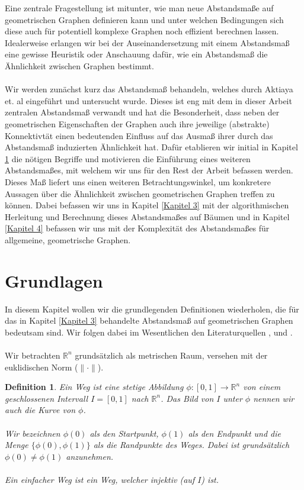\documentclass[a4paper, 12pt, twoside]{article}
\theoremstyle{Format1} %
\newtheorem{Def}{Definition}[section]       %
\begin{document}
Eine zentrale Fragestellung ist mitunter, wie man neue Abstandsmaße auf geometrischen Graphen definieren kann und unter welchen Bedingungen sich diese auch für potentiell
komplexe Graphen noch effizient berechnen lassen.
Idealerweise erlangen wir bei der Auseinandersetzung mit einem Abstandsmaß eine gewisse Heuristik oder Anschauung dafür, wie ein Abstandsmaß die Ähnlichkeit zwischen Graphen bestimmt.
\\
\\
Wir werden zunächst kurz das Abstandsmaß behandeln, welches durch Aktiaya et. al \cite{Akitaya} eingeführt und untersucht wurde.
Dieses ist eng mit dem in dieser Arbeit zentralen Abstandsmaß verwandt und hat die Besonderheit, dass neben der geometrischen Eigenschaften
der Graphen auch ihre jeweilige (abstrakte) Konnektivtät einen bedeutenden Einfluss auf das Ausmaß ihrer durch das Abstandsmaß induzierten Ähnlichkeit hat.
Dafür etablieren wir initial in Kapitel \ref{Kapitel 2} die nötigen Begriffe und
motivieren die Einführung eines weiteren Abstandsmaßes, mit welchem wir uns für den Rest der Arbeit befassen werden.
Dieses Maß liefert uns einen weiteren Betrachtungswinkel, um konkretere Aussagen
über die Ähnlichkeit zwischen geometrischen Graphen treffen zu können.
Dabei befassen wir uns in Kapitel \ref{Kapitel 3} mit der algorithmischen Herleitung und Berechnung dieses Abstandsmaßes auf Bäumen und in Kapitel \ref{Kapitel 4} befassen wir uns mit der
Komplexität des Abstandsmaßes für allgemeine, geometrische Graphen.
\newpage

\section{Grundlagen} \label{Kapitel 2}
In diesem Kapitel wollen wir die grundlegenden Definitionen wiederholen, die für das in Kapitel \ref{Kapitel 3} behandelte Abstandsmaß auf
geometrischen Graphen bedeutsam sind. Wir folgen dabei im Wesentlichen den Literaturquellen \cite{Buchin}, \cite{Akitaya} und \cite{Alt}.
\\
\\
Wir betrachten $ \mathbb{R}^n $ grundsätzlich als metrischen Raum, versehen mit der euklidischen Norm ($\| \cdot \|$).

\begin{Def}
	Ein \textit{Weg} ist eine stetige Abbildung $ \phi: [0,1] \to \mathbb{R}^n $ von einem geschlossenen Intervall $I = [0,1]$ nach $\mathbb{R}^n$.
	Das Bild von $I$ unter $\phi$ nennen wir auch die \textit{Kurve} von $\phi$.
	\\
	\\
	Wir bezeichnen $\phi(0)$ als den \textit{Startpunkt}, $\phi(1)$ als den \textit{Endpunkt} und die Menge
	$\{\phi(0), \phi(1)\}$ als die \textit{Randpunkte} des Weges. Dabei ist grundsätzlich $\phi(0) \neq \phi(1)$ anzunehmen.
	\\
	\\
	Ein \textit{einfacher Weg} ist ein Weg, welcher injektiv (auf $I$) ist.
\end{Def}
\end{document}
